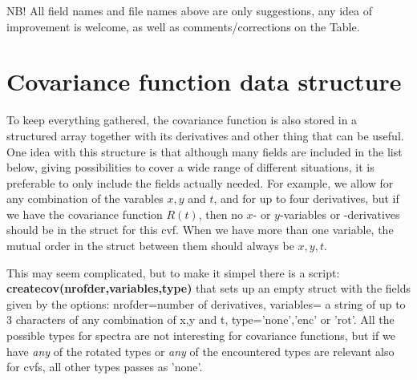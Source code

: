 \documentclass{article}
\begin{document}
NB! All field names and file names above are only suggestions, any
idea of improvement is welcome, as well as comments/corrections on the 
Table.
\section{Covariance function data structure}
To keep everything gathered, the covariance function is also stored in 
a structured array together with its derivatives and other thing that
can be useful. One idea with this structure is that although many
fields are included in the list below, giving possibilities to cover a
wide range of different situations, it is preferable to only include  the
fields actually needed. For example, we allow for any combination of the varables $x,y$ and
$t$, and for up to four derivatives, but if we have the covariance
function $R(t)$, then no $x$- or $y$-variables or -derivatives should be in
the struct for this cvf. When we have more than one variable, the
mutual  order in the
struct between them should always be $x,y,t$.

This may seem complicated, but to make it simpel there is a
script:\\\textbf{createcov(nrofder,variables,type)} that sets up an
empty struct with the fields given by the options: nrofder=number of 
derivatives, variables= a string of up to 3 characters of any
combination of x,y and t, type='none','enc' or 'rot'. All the possible 
types for spectra are not interesting for covariance functions,
but if we have \textsl{any} of the rotated types or \textsl{any} of the encountered
types are relevant also for cvfs, all other types passes as 'none'.
\end{document}

